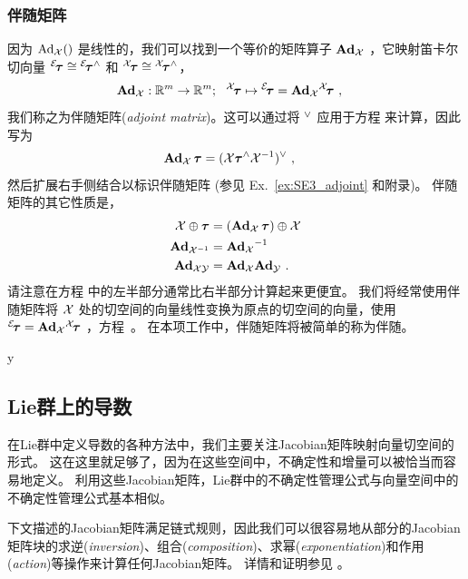 \subsubsection{伴随矩阵}
因为 $\Adh{\cX}()$ 是线性的，我们可以找到一个等价的矩阵算子 $\Ad{\cX}$ ，它映射笛卡尔切向量 ${^\cE}\!\bftau\cong{^\cE}\!\bftau\hhat$ 和 ${^\cX}\!\bftau\cong{^\cX}\!\bftau\hhat$，
%
\begin{align}
\Ad{\cX}:\bbR^m\to\bbR^m;~~ ^\cX\!\bftau\mapsto {^\cE}\!\bftau &= \Ad[\cM]{\cX}{^\cX}\!\bftau \label{equ:Adj2} 
~,
\end{align}
%
我们称之为伴随矩阵(\emph{adjoint matrix})。这可以通过将 $\vvee$ 应用于方程  来计算，因此写为
%
\begin{align}\label{equ:Adj4} 
\Ad[\cM]{\cX}\,\bftau &= (\cX\bftau\hhat\cX\inv)\vvee 
~,
\end{align}
%
然后扩展右手侧结合以标识伴随矩阵 (参见 Ex.~\ref{ex:SE3_adjoint} 和附录)。
伴随矩阵的其它性质是，
%
\begin{align}
\cX\op\bftau &= (\Ad[\cM]{\cX}\,\bftau)\op\cX \label{equ:Adj1} \\
\Ad[\cM]{\cX\inv} &= \Ad[\cM]{\cX}\inv \label{equ:Adj5} \\
\Ad[\cM]{\cX\cY} &=\Ad[\cM]{\cX}\Ad[\cM]{\cY} \label{equ:Adj7}
~.
\end{align}
%
请注意在方程  中的左半部分通常比右半部分计算起来更便宜。
我们将经常使用伴随矩阵将 $\cX$ 处的切空间的向量线性变换为原点的切空间的向量，使用 ${^\cE}\!\bftau = \Ad{\cX}{^\cX}\!\bftau$ ，方程~。
在本项工作中，伴随矩阵将被简单的称为伴随。



\if\examples y

\fi




\subsection{Lie群上的导数}

在Lie群中定义导数的各种方法中，我们主要关注Jacobian矩阵映射向量切空间的形式。 
这在这里就足够了，因为在这些空间中，不确定性和增量可以被恰当而容易地定义。
利用这些Jacobian矩阵，Lie群中的不确定性管理公式与向量空间中的不确定性管理公式基本相似。

下文描述的Jacobian矩阵满足链式规则，因此我们可以很容易地从部分的Jacobian矩阵块的求逆(\emph{inversion})、组合(\emph{composition})、求幂(\emph{exponentiation})和作用(\emph{action})等操作来计算任何Jacobian矩阵。
详情和证明参见  。


